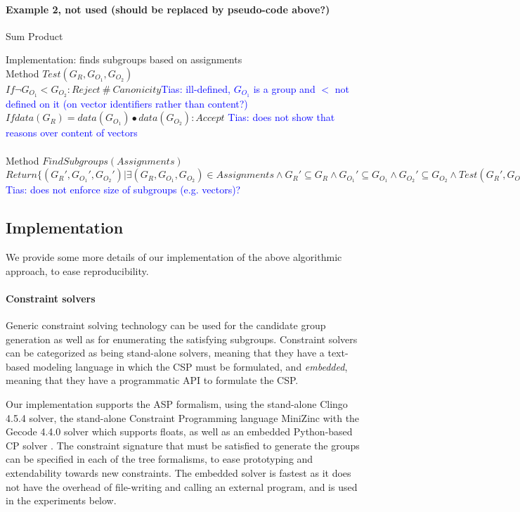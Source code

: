 \documentclass{sig-alternate-05-2015}
\newcommand{\tias}[1]{\textcolor{blue}{{\sc Tias:} #1}\xspace}
\begin{document}
\paragraph{Example 2, not used (should be replaced by pseudo-code above?)}
Sum Product

Implementation: finds subgroups based on assignments\\
Method $Test(G_R, G_{O_1}, G_{O_2})$\\
$If \lnot G_{O_1} < G_{O_2}: Reject~\#~Canonicity$\tias{ill-defined, $G_{O_1}$ is a group and $<$ not defined on it (on vector identifiers rather than content?)}\\
$If data(G_R) = data(G_{O_1}) \bullet data(G_{O_2}): Accept$ \tias{does not show that reasons over content of vectors}
\\\\
Method $FindSubgroups(Assignments)$\\
$Return \{ (G_R', G_{O_1}', G_{O_2}') | \exists (G_R, G_{O_1}, G_{O_2}) \in Assignments \land G_R' \subseteq G_R \land G_{O_1}' \subseteq G_{O_1} \land G_{O_2}' \subseteq G_{O_2} \land Test(G_R', G_{O_1}', G_{O_2}') \}$ \tias{does not enforce size of subgroups (e.g. vectors)?}


\subsection{Implementation}
We provide some more details of our implementation of the above algorithmic approach, to ease reproducibility.

\paragraph{Constraint solvers}
Generic constraint solving technology can be used for the candidate group generation as well as for enumerating the satisfying subgroups. Constraint solvers can be categorized as being stand-alone solvers, meaning that they have a text-based modeling language in which the CSP must be formulated, and \textit{embedded}, meaning that they have a programmatic API to formulate the CSP.

Our implementation supports the ASP \cite{whaisasp} formalism, using the stand-alone Clingo 4.5.4 \cite{clingo} solver, the stand-alone Constraint Programming language MiniZinc \cite{minizinc} with the Gecode 4.4.0 solver which supports floats, as well as an embedded Python-based CP solver \cite{python_constraint}. The constraint signature that must be satisfied to generate the groups can be specified in each of the tree formalisms, to ease prototyping and extendability towards new constraints. The embedded solver is fastest as it does not have the overhead of file-writing and calling an external program, and is used in the experiments below.
\end{document}
